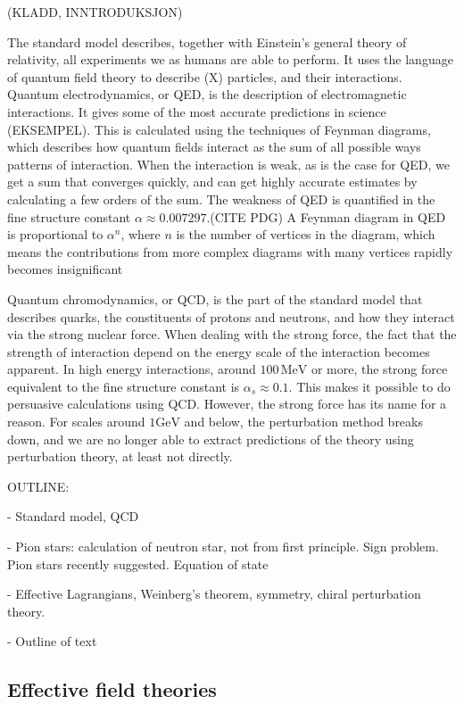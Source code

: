 (KLADD, INNTRODUKSJON)

The standard model describes, together with Einstein's general theory of relativity, all experiments we as humans are able to perform.
It uses the language of quantum field theory to describe (X) particles, and their interactions.
Quantum electrodynamics, or QED, is the description of electromagnetic interactions.
It gives some of the most accurate predictions in science (EKSEMPEL).
This is calculated using the techniques of Feynman diagrams, which describes how quantum fields interact as the sum of all possible ways patterns of interaction.
When the interaction is weak, as is the case for QED, we get a sum that converges quickly, and can get highly accurate estimates by calculating a few orders of the sum.
The weakness of QED is quantified in the fine structure constant $\alpha \approx 0.00 7297$.(CITE PDG)
A Feynman diagram in QED is proportional to $\alpha^n$, where $n$ is the number of vertices in the diagram, which means the contributions from more complex diagrams with many vertices rapidly becomes insignificant


Quantum chromodynamics, or QCD, is the part of the standard model that describes quarks, the constituents of protons and neutrons, and how they interact via the strong nuclear force.
When dealing with the strong force, the fact that the strength of interaction depend on the energy scale of the interaction becomes apparent.
In high energy interactions, around $100\, \text{MeV}$ or more, the strong force equivalent to the fine structure constant is $\alpha_s \approx 0.1$. 
This makes it possible to do persuasive calculations using QCD.
However, the strong force has its name for a reason.
For scales around $1 \text{GeV}$ and below, the perturbation method breaks down, and we are no longer able to extract predictions of the theory using perturbation theory, at least not directly.

OUTLINE: 

- Standard model, QCD

- Pion stars: calculation of neutron star, not from first principle. Sign problem. Pion stars recently suggested. Equation of state

- Effective Lagrangians,  Weinberg's theorem, symmetry, chiral perturbation theory.

- Outline of text

\subsection*{Effective field theories}

